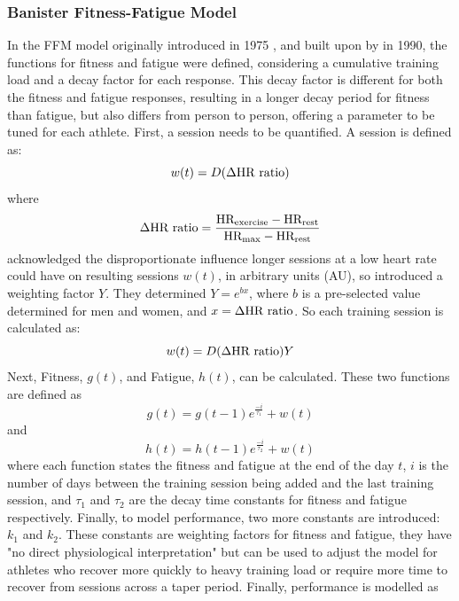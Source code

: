 \subsubsection{Banister Fitness-Fatigue Model}
 In the FFM model originally introduced in 1975 \cite{Bannister1976}, and built upon by \textcite{Morton1990} in 1990, the functions for fitness and fatigue were defined, considering a cumulative training load and a decay factor for each response. This decay factor is different for both the fitness and fatigue responses, resulting in a longer decay period for fitness than fatigue, but also differs from person to person, offering a parameter to be tuned for each athlete. First, a session needs to be quantified. A session is defined as:
\begin{equation}\label{eq:ban_imp_base}
  w(t) = D (\Delta \textnormal{HR ratio})
\end{equation}
where
\begin{equation*}
  \Delta \textnormal{HR ratio} = \frac{\textnormal{HR}_\textnormal{exercise} - \textnormal{HR}_\textnormal{rest}}{\textnormal{HR}_\textnormal{max} - \textnormal{HR}_\textnormal{rest}}
\end{equation*}
\textcite{Morton1990} acknowledged the disproportionate influence longer sessions at a low heart rate could have on resulting sessions $w(t)$, in arbitrary units (AU), so introduced a weighting factor $Y$. They determined $Y = e^{bx}$, where $b$ is a pre-selected value determined for men and women, and $x = \Delta \textnormal{HR ratio}$. So each training session is calculated as:
\begin{equation}\label{eq:ban_impulse}
  w(t) = D (\Delta \textnormal{HR ratio})Y
\end{equation}
Next, Fitness, $g(t)$, and Fatigue, $h(t)$, can be calculated. These two functions are defined as
\begin{equation}\label{eq:ban_fit}
  g(t) = g(t - 1)e^\frac{-i}{\tau_1} + w(t)
\end{equation}
and
\begin{equation}\label{eq:ban_fat}
  h(t) = h(t - 1)e^\frac{-i}{\tau_2} + w(t)
\end{equation}
where each function states the fitness and fatigue at the end of the day $t$, $i$ is the number of days between the training session being added and the last training session, and $\tau_1$ and $\tau_2$ are the decay time constants for fitness and fatigue respectively. Finally, to model performance, two more constants are introduced: $k_1$ and $k_2$. These constants are weighting factors for fitness and fatigue, they have "no direct physiological interpretation" \cite{Morton1990} but can be used to adjust the model for athletes who recover more quickly to heavy training load or require more time to recover from sessions across a taper period. Finally, performance is modelled as
